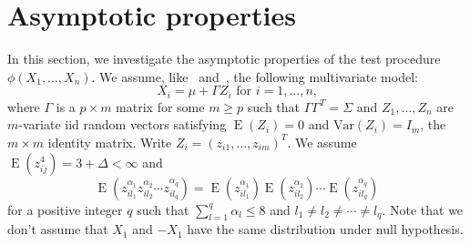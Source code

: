 \documentclass[smallcondensed,final,natbib]{svjour3}          %
\DeclareMathOperator{\myE}{E}
\begin{document}
\section{Asymptotic properties}
In this section, we investigate the asymptotic properties of the test procedure $\phi(X_1,\ldots,X_n)$.
We assume, like~\citet{Chen2010A} and~\citet{Bai1996Efiect}, the following multivariate model:
\begin{equation}\label{chenC1}
    \textrm{$X_i=\mu+\Gamma Z_i$  for  $i=1,\ldots,n$,}
\end{equation}
where $\Gamma$ is a $p\times m$ matrix for some $m\geq p$ such that $\Gamma\Gamma^T=\Sigma$ and $Z_{1},\ldots, Z_n$ are $m$-variate iid random vectors satisfying $\myE(Z_i)=0$ and $\mathrm{Var}(Z_i)=I_m$, the $m\times m$ identity matrix. Write $Z_i={(z_{i1},\ldots,z_{im})}^T$. We assume $\myE(z_{ij}^4)=3+\Delta<\infty$ and
\begin{equation}\label{chenC2}
    \myE(z_{il_1}^{\alpha_1}z_{il_2}^{\alpha_2}\cdots z_{il_q}^{\alpha_q})=\myE(z_{il_1}^{\alpha_1})\myE(z_{il_2}^{\alpha_2})\cdots \myE(z_{il_q}^{\alpha_q})
\end{equation}
for a positive integer $q$ such that $\sum_{l=1}^q \alpha_l\leq 8$ and $l_1\neq l_2\neq \cdots \neq l_q$.
Note that we don't assume that $X_1$ and $-X_1$  have the same distribution under null hypothesis.

\end{document}
